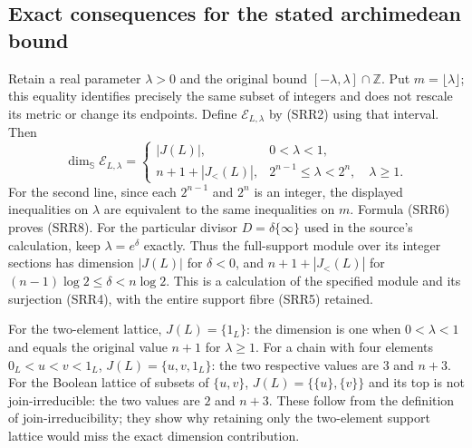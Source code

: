 \subsection{Exact consequences for the stated archimedean bound}

Retain a real parameter $\lambda>0$ and the original bound
$[-\lambda,\lambda]\cap\mathbb Z$. Put $m=\lfloor\lambda\rfloor$;
this equality identifies precisely the same subset of integers and
does not rescale its metric or change its endpoints. Define
$\mathcal E_{L,\lambda}$ by (SRR2) using that interval. Then
\begin{equation}\tag{SRR8}
\dim_{\mathbb S}\mathcal E_{L,\lambda}=
\begin{cases}
 |J(L)|,&0<\lambda<1,\\
 n+1+|J_{<}(L)|,&2^{n-1}\le\lambda<2^n,\quad\lambda\ge1.
\end{cases}
\end{equation}
For the second line, since each $2^{n-1}$ and $2^n$ is an integer,
the displayed inequalities on $\lambda$ are equivalent to the
same inequalities on $m$. Formula (SRR6) proves (SRR8).
For the particular divisor $D=\delta\{\infty\}$ used in the
source's calculation, keep $\lambda=e^\delta$ exactly. Thus the
full-support module over its integer sections has dimension $|J(L)|$
for $\delta<0$, and $n+1+|J_{<}(L)|$ for
$(n-1)\log2\le\delta<n\log2$. This is a calculation of the
specified module and its surjection (SRR4), with the entire support
fibre (SRR5) retained.

For the two-element lattice, $J(L)=\{1_L\}$: the dimension is one
when $0<\lambda<1$ and equals the original value $n+1$ for
$\lambda\ge1$. For a chain with four elements
$0_L<u<v<1_L$, $J(L)=\{u,v,1_L\}$: the two respective values are
$3$ and $n+3$. For the Boolean lattice of subsets of $\{u,v\}$,
$J(L)=\{\{u\},\{v\}\}$ and its top is not join-irreducible:
the two values are $2$ and $n+3$. These follow from the definition
of join-irreducibility; they show why retaining only the two-element
support lattice would miss the exact dimension contribution.
